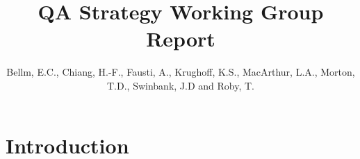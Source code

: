 \documentclass[DM,authoryear,toc,lsstdraft]{lsstdoc}
\title{QA Strategy Working Group Report}
\author{%
Bellm, E.C.,
Chiang, H.-F.,
Fausti, A.,
Krughoff, K.S.,
MacArthur, L.A.,
Morton, T.D.,
Swinbank, J.D and
Roby, T.
}
\date{\vcsDate}
\begin{document}
\maketitle

\section{Introduction}
\label{sec:intro}


%

%
\end{document}
